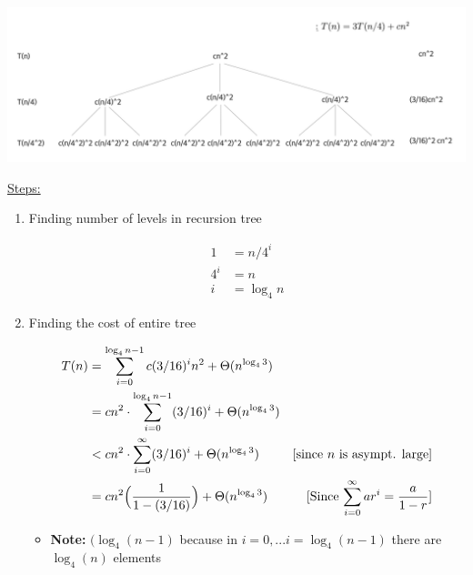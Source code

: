 \documentclass[12pt]{article}
\begin{document}
\begin{enumerate}[1.]
\begin{itemize}
        \begin{center}
        \includegraphics[width=\linewidth]{images/worksheet_0_solution_3.png}
        \end{center}

        \bigskip

        \underline{Steps:}

        \bigskip

        \begin{enumerate}[1.]
            \item Finding number of levels in recursion tree

            \begin{align}
                1 &= n/4^i\\
                4^i &= n\\
                i &= \log_4 n
            \end{align}

            \item Finding the cost of entire tree

            \begin{align}
            T(n) &= \sum\limits_{i=0}^{\log_4 n - 1} c(3/16)^in^2 + \Theta(n^{\log_4 3})\\
            &= cn^2 \cdot \sum\limits_{i=0}^{\log_4 n - 1} (3/16)^i + \Theta(n^{\log_4 3})\\
            &< cn^2 \cdot \sum\limits_{i=0}^{\infty} (3/16)^i + \Theta(n^{\log_4 3}) & [\text{since $n$ is asympt. large}]\\
            &= cn^2 \Bigl(\frac{1}{1 - (3/16)} \Bigr) + \Theta(n^{\log_4 3}) & [\text{Since $\sum\limits_{i=0}^{\infty} ar^i = \frac{a}{1 - r}$}]
            \end{align}

            \bigskip

            \begin{itemize}
                \item \textbf{Note:} $(\log_4 (n - 1)$ because in $i = 0, ... i = \log_4 (n - 1)$ there are $\log_4 (n)$ elements
            \end{itemize}



\end{enumerate}
\end{itemize}
\end{enumerate}
\end{document}

